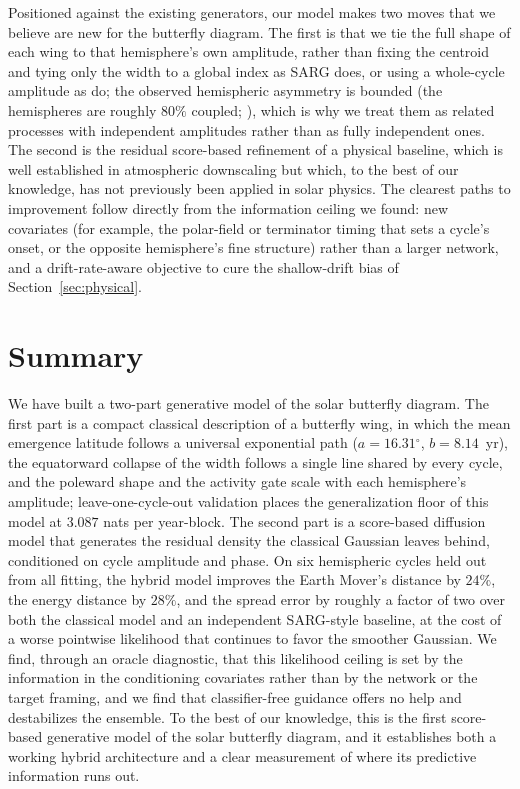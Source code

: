 \documentclass[twocolumn]{aastex631}
\newcommand{\degr}{\ensuremath{^{\circ}}}
\begin{document}
Positioned against the existing generators, our model makes two moves that we
believe are new for the butterfly diagram. The first is that we tie the full
shape of each wing to that hemisphere's own amplitude, rather than fixing the
centroid and tying only the width to a global index as SARG does, or using a
whole-cycle amplitude as \citet[CIT]{Jiang2011} do; the observed hemispheric
asymmetry is bounded (the hemispheres are roughly $80\%$ coupled;
\citealt[CIT]{Norton2014}), which is why we treat them as related processes with
independent amplitudes rather than as fully independent ones.
The second is the residual score-based refinement of a physical baseline, which
is well established in atmospheric downscaling \citep[CIT]{Mardani2025} but which,
to the best of our knowledge, has not previously been applied in solar physics.
The clearest paths to improvement follow directly from the information ceiling we
found: new covariates (for example, the polar-field or terminator timing that
sets a cycle's onset, or the opposite hemisphere's fine structure) rather than a
larger network, and a drift-rate-aware objective to cure the shallow-drift bias
of Section~\ref{sec:physical}.

\section{Summary}
\label{sec:summary}

We have built a two-part generative model of the solar butterfly diagram. The
first part is a compact classical description of a butterfly wing, in which the
mean emergence latitude follows a universal exponential path
($a=16.31\degr$, $b=8.14$~yr), the equatorward collapse of the width follows a
single line shared by every cycle, and the poleward shape and the activity gate
scale with each hemisphere's amplitude; leave-one-cycle-out validation places the
generalization floor of this model at $3.087$ nats per year-block. The second
part is a score-based diffusion model that generates the residual density the
classical Gaussian leaves behind, conditioned on cycle amplitude and phase. On
six hemispheric cycles held out from all fitting, the hybrid model improves the
Earth Mover's distance by $24\%$, the energy distance by $28\%$, and the spread
error by roughly a factor of two over both the classical model and an independent
SARG-style baseline, at the cost of a worse pointwise likelihood that continues
to favor the smoother Gaussian. We find, through an oracle diagnostic, that this
likelihood ceiling is set by the information in the conditioning covariates rather
than by the network or the target framing, and we find that classifier-free
guidance offers no help and destabilizes the ensemble. To the best of our
knowledge, this is the first score-based generative model of the solar butterfly
diagram, and it establishes both a working hybrid architecture and a clear
measurement of where its predictive information runs out.
\end{document}
